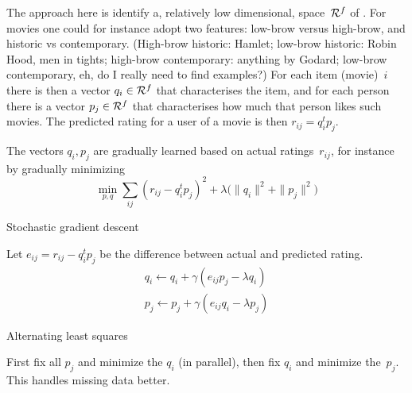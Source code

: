 The approach here is identify a, relatively low dimensional, space~${\cal R}^f$
of . For movies one could for instance adopt two features:
low-brow versus high-brow, and historic vs contemporary.
(High-brow historic: Hamlet; low-brow historic: Robin Hood, men in tights; 
high-brow contemporary: anything by Godard; low-brow contemporary, eh, 
do I really need to find examples?)
For each item (movie)~$i$ there is then a vector $q_i\in{\cal R}^f$ that characterises
the item, and for each person there is a vector $p_j\in{\cal R}^f$ that
characterises how much that person likes such movies. The predicted rating
for a user of a movie is then $r_{ij}=q_i^tp_j$.

The vectors $q_i,p_j$ are gradually learned based on actual
ratings~$r_{ij}$, for instance by gradually minimizing
\[ \min_{p,q} \sum_{ij} (r_{ij}-q_i^tp_j)^2+
    \lambda \bigl( \|q_i\|^2+\|p_j\|^2 \bigr)
\]

 {Stochastic gradient descent}

Let $e_{ij}=r_{ij}-q_i^tp_j$ be the difference between actual and predicted rating.
\[
\begin{array}{l}
  q_i\leftarrow q_i+\gamma (e_{ij}p_j-\lambda q_i)\\
  p_j\leftarrow p_j+\gamma (e_{ij}q_i-\lambda p_j)
\end{array}
\]

 {Alternating least squares}

First fix all $p_j$ and minimize the $q_i$ (in parallel),
then fix $q_i$ and minimize the~$p_j$.
This handles missing data better.

